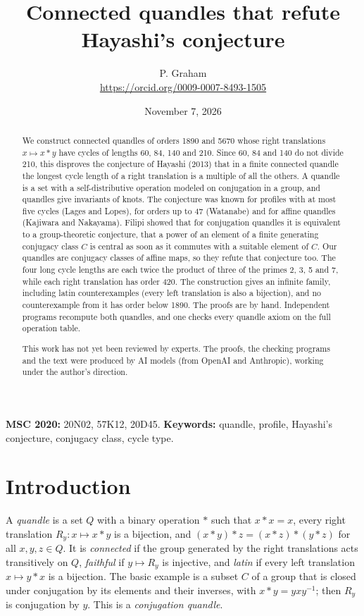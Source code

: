 \documentclass[11pt]{article}
\title{Connected quandles that refute Hayashi's conjecture}
\author{P. Graham\\ \small\url{https://orcid.org/0009-0007-8493-1505}}
\date{November 7, 2026}
\begin{document}
\maketitle
\begin{abstract}
We construct connected quandles of orders 1890 and 5670 whose right
translations $x\mapsto x*y$ have cycles of lengths 60, 84, 140 and 210.
Since 60, 84 and 140 do not divide 210, this disproves the conjecture of
Hayashi (2013) that in a finite connected quandle the longest cycle length
of a right translation is a multiple of all the others. A quandle is a set
with a self-distributive operation modeled on conjugation in a group, and
quandles give invariants of knots. The conjecture was known for profiles
with at most five cycles (Lages and Lopes), for orders up to 47 (Watanabe)
and for affine quandles (Kajiwara and Nakayama). Filipi showed that for
conjugation quandles it is equivalent to a group-theoretic conjecture,
that a power of an element of a finite generating conjugacy class $C$ is
central as soon as it commutes with a suitable element of $C$. Our
quandles are conjugacy classes of affine maps, so they refute that
conjecture too. The four long cycle lengths are each twice the product of
three of the primes 2, 3, 5 and 7, while each right translation has order
420. The construction gives an infinite family, including latin counterexamples
(every left translation is also a bijection), and no counterexample from
it has order below 1890. The proofs are by hand. Independent programs
recompute both quandles, and one checks every quandle axiom on the full
operation table.

This work has not yet been reviewed by experts. The proofs, the checking programs and the text were produced by AI models (from OpenAI and Anthropic), working under the author's direction.
\end{abstract}
\medskip
\noindent\textbf{MSC 2020:} 20N02, 57K12, 20D45.\quad
\textbf{Keywords:} quandle, profile, Hayashi's conjecture, conjugacy class, cycle type.

\section{Introduction}

A \emph{quandle} is a set $Q$ with a binary operation $*$ such that
$x*x=x$, every right translation $R_y\colon x\mapsto x*y$ is a bijection,
and $(x*y)*z=(x*z)*(y*z)$ for all $x,y,z\in Q$. It is \emph{connected} if
the group generated by the right translations acts transitively on $Q$,
\emph{faithful} if $y\mapsto R_y$ is injective, and \emph{latin} if every
left translation $x\mapsto y*x$ is a bijection. The basic example is a
subset $C$ of a group that is closed under conjugation by its elements and
their inverses, with $x*y=yxy^{-1}$; then $R_y$ is conjugation by $y$.
This is a \emph{conjugation quandle}.
\end{document}
